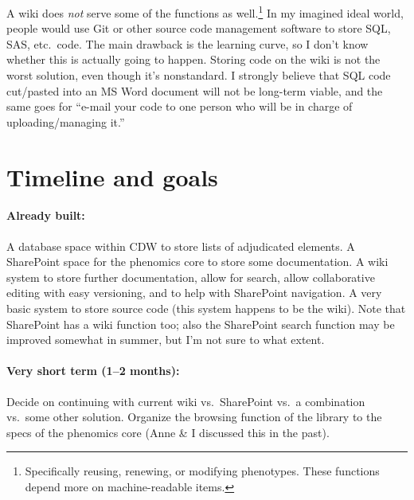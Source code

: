 \documentclass{tufte-handout}
\begin{document}
A wiki does \emph{not} serve some of the functions as
well.\footnote{Specifically reusing, renewing, or modifying
  phenotypes. These functions depend more on machine-readable items.}
In my imagined ideal world, people would use Git or other source code
management software to store SQL, SAS, etc.\ code. The main drawback
is the learning curve, so I don't know whether this is actually going
to happen. Storing code on the wiki is not the worst solution, even
though it's nonstandard. I strongly believe that SQL code cut/pasted
into an MS Word document will not be long-term viable, and the same
goes for ``e-mail your code to one person who will be in charge of
uploading/managing it.''


\section{Timeline and goals}

\paragraph{Already built:}
A database space within CDW to store lists of adjudicated elements. A
SharePoint space for the phenomics core to store some documentation. A
wiki system to store further documentation, allow for search, allow
collaborative editing with easy versioning, and to help with
SharePoint navigation. A very basic system to store source code (this
system happens to be the wiki). Note that SharePoint has a wiki
function too; also the SharePoint search function may be improved
somewhat in summer, but I'm not sure to what extent.

\paragraph{Very short term (1--2 months):}
Decide on continuing with current wiki vs.\ SharePoint vs.\ a
combination vs.\ some other solution. Organize the browsing function
of the library to the specs of the phenomics core (Anne \& I discussed
this in the past).
\end{document}
